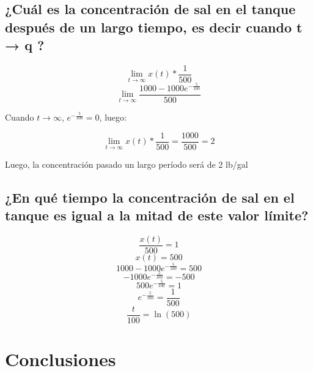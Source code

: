 \documentclass{article}
\begin{document}
        \subsection{¿Cuál es
        la concentración de sal en el tanque después de un largo
        tiempo, es decir cuando t → q ?}

            \[ \lim_{t \to \infty} x(t) * \frac{1}{500} \]
            \[ \lim_{t \to \infty} \frac{1000-1000e^{-\frac{5}{100}}}{500} \]

            Cuando $t \to \infty$, $e^{-\frac{5}{100}} = 0$, luego:

            \[ \lim_{t \to \infty} x(t) * \frac{1}{500} = \frac{1000}{500} = 2 \]
                
            Luego, la concentración pasado un largo período será de 2 lb/gal
        \subsection{¿En qué tiempo la concentración de sal en el tanque es igual a la mitad de este
        valor límite?}

        \[  \frac{x(t)}{500} = 1\]
        \[ x(t) = 500\]
        \[ 1000-1000e^{-\frac{5}{100}} = 500 \]
        \[ -1000e^{-\frac{5}{100}} = -500 \]
        \[ 500e^{-\frac{5}{100}} = 1 \]
        \[  e^{-\frac{5}{100}} = \frac{1}{500} \]
        \[ \frac{t}{100} = \ln(500) \]
        \begin{center}
        \end{center}
        
        \section{Conclusiones}
\end{document}
